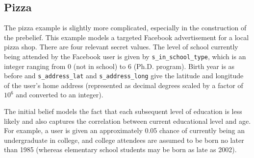 \subsection{Pizza}

The pizza example is slightly more complicated, especially in the
construction of the prebelief.  This example models a targeted
Facebook advertisement for a local pizza shop.  There are four
relevant secret values.  The level of school currently being attended
by the Facebook user is given by \verb|s_in_school_type|, which is an
integer ranging from 0 (not in school) to 6 (Ph.D. program).  Birth
year is as before and \verb|s_address_lat| and \verb|s_address_long|
give the latitude and longitude of the user's home address
(represented as decimal degrees scaled by a factor of $10^6$ and
converted to an integer).

The initial belief models the fact that each subsequent level of
education is less likely and also captures the correlation between
current educational level and age.  For example, a user is given an
approximately 0.05 chance of currently being an undergraduate in
college, and college attendees are assumed to be born no later than
1985 (whereas elementary school students may be born as late as 2002).

